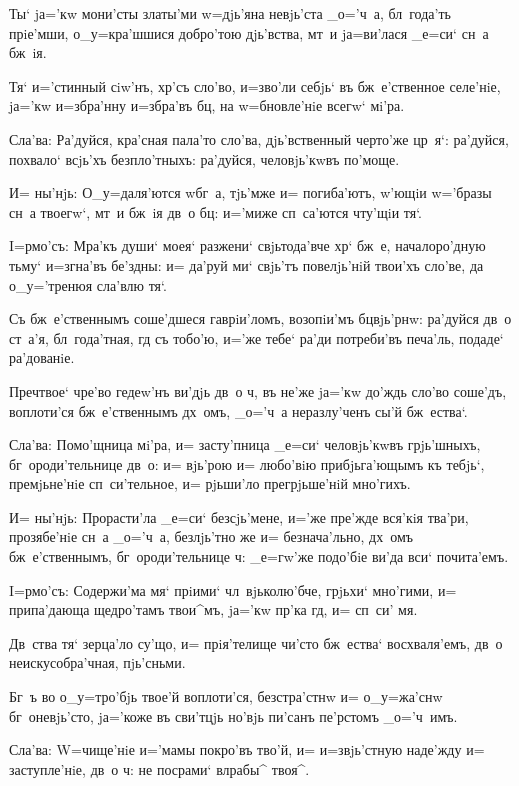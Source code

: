 Ты` jа='кw мони'сты златы'ми w=дjь'яна невjь'ста 
_о='ч~а, бл~года'ть прiе'мши, о_у=кра'шшися добро'тою 
дjь'вства, мт~и jа=ви'лася _е=си` сн~а бж~iя.

Тя` и='стинный сiw'нъ, хр'съ сло'во, и=зво'ли 
себjь` въ бж~е'ственное селе'нiе, jа='кw и=збра'нну 
и=збра'въ бц, на w=бновле'нiе всегw` мi'ра.

Сла'ва: Ра'дуйся, кра'сная пала'то сло'ва, 
дjь'вственный черто'же цр~я`: ра'дуйся, похвало` всjь'хъ 
безпло'тныхъ: ра'дуйся, человjь'кwвъ по'моще.

И= ны'нjь: О_у=даля'ются w\т бг~а, тjь'мже и= 
погиба'ютъ, w'ющiи w='бразы сн~а твоегw`, мт~и 
бж~iя дв~о бц: и='миже сп~са'ются чту'щiи тя`.


I=рмо'съ: Мра'къ души` моея` разжени` свjьтода'вче 
хр` бж~е, началоро'дную тьму` и=згна'въ бе'здны: и= 
да'руй ми` свjь'тъ повелjь'нiй твои'хъ сло'ве, да 
о_у='тренюя сла'влю тя`.

Съ бж~е'ственнымъ соше'дшеся гаврiи'ломъ, возопiи'мъ 
бц вjь'рнw: ра'дуйся дв~о ст~а'я, бл~года'тная, гд 
съ тобо'ю, и='же тебе` ра'ди потреби'въ печа'ль, подаде` 
ра'дованiе.

Преч твое` чре'во гедеw'нъ ви'дjь дв~о ч, въ 
не'же jа='кw до'ждь сло'во соше'дъ, воплоти'ся 
бж~е'ственнымъ дх~омъ, _о='ч~а неразлу'ченъ сы'й 
бж~ества`.

Сла'ва: Помо'щница мi'ра, и= засту'пница _е=си` 
человjь'кwвъ грjь'шныхъ, бг~ороди'тельнице дв~о: и= 
вjь'рою и= любо'вiю прибjьга'ющымъ къ тебjь`, 
премjьне'нiе сп~си'тельное, и= рjьши'ло прегрjьше'нiй 
мно'гихъ.

И= ны'нjь: Прорасти'ла _е=си` без\ъ сjь'мене, и='же 
пре'жде вся'кiя тва'ри, прозябе'нiе сн~а _о='ч~а, 
безлjь'тно же и= безнача'льно, дх~омъ бж~е'ственнымъ, 
бг~ороди'тельнице ч: _е=гw'же подо'бiе ви'да вси` 
почита'емъ.


I=рмо'съ: Содержи'ма мя` прiими` чл~вjьколю'бче, 
грjьхи` мно'гими, и= припа'дающа щедро'тамъ твои^мъ, 
jа='кw пр'ка гд, и= сп~си' мя.

Дв~ства тя` зерца'ло су'що, и= прiя'телище чи'сто 
бж~ества` восхваля'емъ, дв~о неискусобра'чная, пjь'сньми.

Бг~ъ во о_у=тро'бjь твое'й воплоти'ся, безстра'стнw и= 
о_у=жа'снw бг~оневjь'сто, jа='коже въ сви'тцjь но'вjь 
пи'санъ пе'рстомъ _о='ч~имъ.

Сла'ва: W=чище'нiе и='мамы покро'въ тво'й, и= 
и=звjь'стную наде'жду и= заступле'нiе, дв~о ч: не 
посрами` вл рабы^ твоя^.

